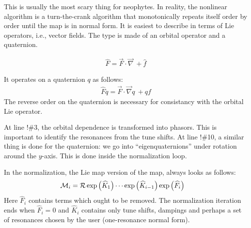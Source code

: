 \documentclass{hitec}     %
\begin{document}
{{{{{{{This is usually the most scary thing for neophytes. In reality, the nonlinear algorithm is a turn-the-crank algorithm that monotonically repeats itself order by order until the map is in normal form. It is easiest to describe in terms of Lie operators, i.e., vector fields.  The type  is made of an orbital operator and a quaternion. 

%
\begin{align} \widehat{F}=
\vec{F}\cdot \vec{\nabla }\ +\widehat{f}  \label{eq:hop}\end{align}

It operates on a quaternion $q$ as follows:
%
\begin{align} \widehat{F}q=
\vec{F}\cdot \vec{\nabla }q\ +qf  \label{hopq}\end{align}
The reverse order on the quaternion is necessary for consistancy with the orbital Lie operator.

At line !\#3, the orbital dependence is transformed into phasors. This is important to identify the resonances from the tune shifts. At line !\#10, a similar thing is done for the quaternion: we go into ``eigenquaternions'' under rotation around the $y$-axis. This is done inside the normalization loop.

In the normalization, the Lie map version of the map, always looks as follows:
%
\begin{align} {{\cal M}}_{i}&={\cal R}\exp\left({{\widehat{K}}_{1}}\right)\cdots\exp\left({{\widehat{K}}_{i-1}}\right)\exp\left({{\widehat{F}}_{i}}\right) \end{align}
%
Here ${{\widehat{F}}_{i}}$ contains terms which ought to be removed. The normalization iteration ends when ${{\widehat{F}}_{i}}=0$  and ${{\widehat{K}}_{i}}$ contains only tune shifts, dampings and perhaps a set of resonances chosen by the user (one-resonance normal form).

}}}}}}}
\end{document}
